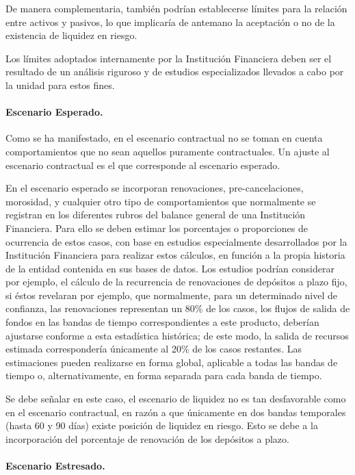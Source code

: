 \documentclass[10pt,]{article}
\begin{document}
De manera complementaria, también podrían establecerse límites para la
relación entre activos y pasivos, lo que implicaría de antemano la
aceptación o no de la existencia de liquidez en riesgo.

Los límites adoptados internamente por la Institución Financiera deben
ser el resultado de un análisis riguroso y de estudios especializados
llevados a cabo por la unidad para estos fines.

\hypertarget{escenario-esperado.}{%
\paragraph{Escenario Esperado.}\label{escenario-esperado.}}

Como se ha manifestado, en el escenario contractual no se toman en
cuenta comportamientos que no sean aquellos puramente contractuales. Un
ajuste al escenario contractual es el que corresponde al escenario
esperado.

En el escenario esperado se incorporan renovaciones, pre-cancelaciones,
morosidad, y cualquier otro tipo de comportamientos que normalmente se
registran en los diferentes rubros del balance general de una
Institución Financiera. Para ello se deben estimar los porcentajes o
proporciones de ocurrencia de estos casos, con base en estudios
especialmente desarrollados por la Institución Financiera para realizar
estos cálculos, en función a la propia historia de la entidad contenida
en sus bases de datos. Los estudios podrían considerar por ejemplo, el
cálculo de la recurrencia de renovaciones de depósitos a plazo fijo, si
éstos revelaran por ejemplo, que normalmente, para un determinado nivel
de confianza, las renovaciones representan un 80\% de los casos, los
flujos de salida de fondos en las bandas de tiempo correspondientes a
este producto, deberían ajustarse conforme a esta estadística histórica;
de este modo, la salida de recursos estimada correspondería únicamente
al 20\% de los casos restantes. Las estimaciones pueden realizarse en
forma global, aplicable a todas las bandas de tiempo o,
alternativamente, en forma separada para cada banda de tiempo.

Se debe señalar en este caso, el escenario de liquidez no es tan
desfavorable como en el escenario contractual, en razón a que únicamente
en dos bandas temporales (hasta 60 y 90 días) existe posición de
liquidez en riesgo. Esto se debe a la incorporación del porcentaje de
renovación de los depósitos a plazo.

\hypertarget{escenario-estresado.}{%
\paragraph{Escenario Estresado.}\label{escenario-estresado.}}
\end{document}

